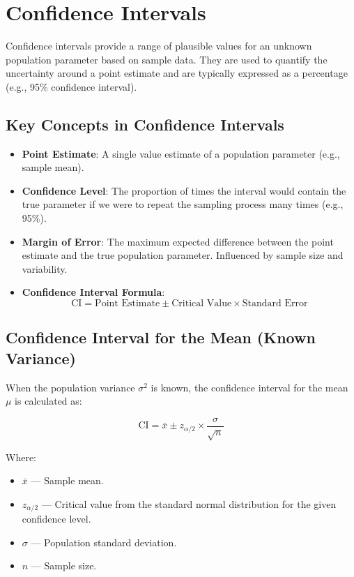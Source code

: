 \section{Confidence Intervals}

Confidence intervals provide a range of plausible values for an unknown population parameter based on sample data. They are used to quantify the uncertainty around a point estimate and are typically expressed as a percentage (e.g., 95\% confidence interval).

\subsection{Key Concepts in Confidence Intervals}
\begin{itemize}
    \item \textbf{Point Estimate}: A single value estimate of a population parameter (e.g., sample mean).
    \item \textbf{Confidence Level}: The proportion of times the interval would contain the true parameter if we were to repeat the sampling process many times (e.g., 95\%).
    \item \textbf{Margin of Error}: The maximum expected difference between the point estimate and the true population parameter. Influenced by sample size and variability.
    \item \textbf{Confidence Interval Formula}: 
        \[
        \text{CI} = \text{Point Estimate} \pm \text{Critical Value} \times \text{Standard Error}
        \]
\end{itemize}

\subsection{Confidence Interval for the Mean (Known Variance)}
When the population variance \(\sigma^2\) is known, the confidence interval for the mean \(\mu\) is calculated as:

\[
\text{CI} = \bar{x} \pm z_{\alpha/2} \times \frac{\sigma}{\sqrt{n}}
\]

Where:
\begin{itemize}
    \item \(\bar{x}\) --- Sample mean.
    \item \(z_{\alpha/2}\) --- Critical value from the standard normal distribution for the given confidence level.
    \item \(\sigma\) --- Population standard deviation.
    \item \(n\) --- Sample size.
\end{itemize}

